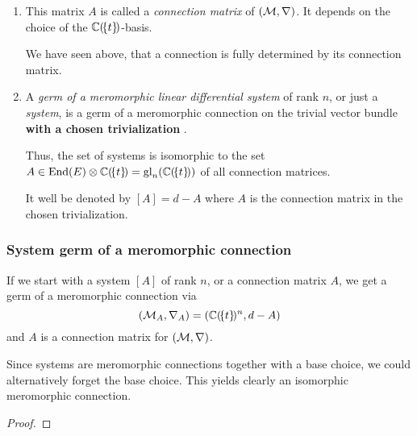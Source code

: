 \begin{comment}
  This means that the connection $\nabla$ is fully determined by the matrix $A$
  and thus is fully determined by $A'$.
\end{comment}
\begin{defn}
  \begin{enumerate}
    \item This matrix $A$ is called a \emph{connection matrix} of
      $(\mathcal{M},\nabla)$. It depends on the choice of the $\mathbb{C}(\!\{t\}\!)$-basis.
      \begin{s-rem}
        We have seen above, that a connection is fully determined by its
        connection matrix.
      \end{s-rem}
    \item A \emph{germ of a meromorphic linear differential system} of rank
      $n$, or just a \emph{system}, is a germ of a meromorphic connection on
      the trivial vector bundle \textbf{with a chosen trivialization}
      .
      \begin{s-prop}
        Thus, the set of systems is isomorphic to the set
        $A\in\operatorname{End}(E)\otimes\mathbb{C}(\!\{t\}\!)=\operatorname{gl}_n(\mathbb{C}(\!\{t\}\!))$ of all
        connection matrices.
      \end{s-prop}
      It well be denoted by $[A]=d-A$ where $A$ is the connection matrix in the
      chosen trivialization.
  \end{enumerate}
\end{defn}

\begin{comment}
  \cite{boalch} wants \textbf{generic} meromorphic connections
  \begin{itemize}
    \item\dots simplest jet sufficient\dots
  \end{itemize}
\end{comment}

\subsubsection{System \rightarrow{} germ of a meromorphic connection}
\begin{prop}
  If we start with a system $[A]$ of rank $n$, or a connection matrix $A$, we
  get a germ of a meromorphic connection via
  \[
    (\mathcal{M}_A,\nabla_A)=(\mathbb{C}(\!\{t\}\!)^n,d-A)
  \]
  and $A$ is a connection matrix for $(\mathcal{M},\nabla)$.
  \begin{s-rem}
    Since systems are meromorphic connections together with a base choice, we
    could alternatively forget the base choice. This yields clearly an
    isomorphic meromorphic connection.
  \end{s-rem}
\end{prop}
\begin{proof}
  \TODO{}
\end{proof}

